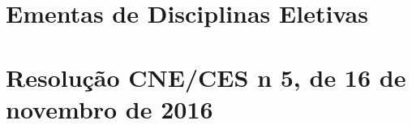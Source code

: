 \chapter{Ementas de Disciplinas Eletivas}
% 











\chapter{Resolução CNE/CES n\textordmasculine{} 5, de 16 de novembro de 2016}
\label{cne2016}


